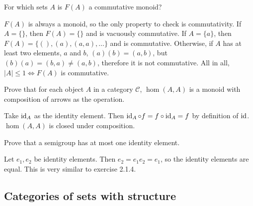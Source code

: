 \begin{exercise}
    For which sets \(A\) is \(F(A)\) a commutative monoid?
\end{exercise}
\begin{solution}
    \(F(A)\) is always a monoid, so the only property to check is commutativity. If \(A = \{\}\), then \(F(A) = \{\}\) and is vacuously commutative. If \(A = \{a\}\), then \(F(A) = \{(), (a), (a, a), \dots\}\) and is commutative. Otherwise, if \(A\) has at least two elements, \(a\) and \(b\), \((a)(b) = (a, b)\), but \((b)(a) = (b, a) \neq (a, b)\), therefore it is not commutative. All in all, \(|A| \leq 1 \Leftrightarrow F(A)\) is commutative.
\end{solution}
\begin{exercise}
    Prove that for each object \(A\) in a category \(\mathcal{C}\), \(\hom(A, A)\) is a monoid with composition of arrows as the operation.
\end{exercise}
\begin{solution}
    Take \(\operatorname{id}_A\) as the identity element. Then \(\operatorname{id}_A \circ f = f \circ \operatorname{id}_A = f\) by definition of \(\operatorname{id}\). \(\hom(A, A)\) is closed under composition.
\end{solution}
\begin{exercise}
    Prove that a semigroup has at most one identity element.
\end{exercise}
\begin{solution}
    Let \(e_1, e_2\) be identity elements. Then \(e_2 = e_1 e_2 = e_1\), so the identity elements are equal. This is very similar to exercise 2.1.4.
\end{solution}

\subsection{Categories of sets with structure}



